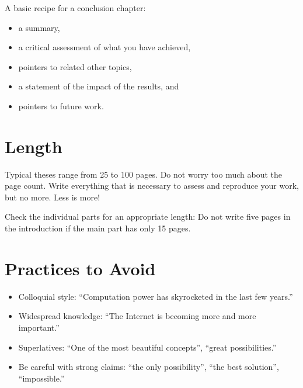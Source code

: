 A basic recipe for a conclusion chapter:
\begin{itemize}
\item a summary,
\item a critical assessment of what you have achieved,
\item pointers to related other topics,
\item a statement of the impact of the results, and
\item pointers to future work.
\end{itemize}

\section{Length}

Typical theses range from 25 to 100 pages. Do not worry too much about the page count. Write everything that is necessary to assess and reproduce your work, but no more. Less is more!

Check the individual parts for an appropriate length: Do not write five pages in the introduction if the main part has only 15 pages.


\section{Practices to Avoid}

\begin{itemize}
\item Colloquial style: “Computation power has skyrocketed in the last few years.”
\item Widespread knowledge: “The Internet is becoming more and more important.”
\item Superlatives: “One of the most beautiful concepts”, “great possibilities.”
\item Be careful with strong claims: “the only possibility”, “the best solution”, “impossible.”
\end{itemize}
